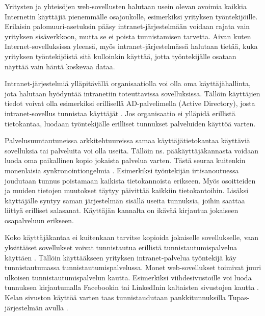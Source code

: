 Yritysten ja yhteisöjen web-sovellusten halutaan usein olevan avoimia kaikkia Internetin käyttäjiä pienemmälle osajoukolle, esimerkiksi yrityksen työntekijöille. Erilaisin palomuuri-asetuksin pääsy intranet-järjestelmään voidaan rajata vain yrityksen sisäverkkoon, mutta se ei poista tunnistamisen tarvetta. Aivan kuten Internet-sovelluksissa yleensä, myös intranet-järjestelmässä halutaan tietää, kuka yrityksen työntekijöistä sitä kulloinkin käyttää, jotta työntekijälle osataan näyttää vain häntä koskevaa dataa.

Intranet-järjestelmiä ylläpitävällä organisaatiolla voi olla oma käyttäjähallinta, jota halutaan hyödyntää intranetiin toteuttavissa sovelluksissa. Tällöin käyttäjien tiedot voivat olla esimerkiksi erillisellä AD-palvelimella (Active Directory), josta intranet-sovellus tunnistaa käyttäjät \cite{active_directory}. Jos organisaatio ei ylläpidä erillistä tietokantaa, luodaan työntekijälle erilliset tunnukset palveluiden käyttöä varten.

Palvelusuuntautuneissa arkkitehtuureissa samaa käyttäjätietokantaa käyttäviä sovelluksia tai palveluita voi olla useita. Tällöin ns. pääkäyttäjäkannasta voidaan luoda oma paikallinen kopio jokaista palvelua varten. Tästä seuraa kuitenkin monenlaisia synkronointiongelmia \cite{synkronointi}. Esimerkiksi työntekijän irtisanoutuessa joudutaan tunnus poistamaan kaikista tietokannoista erikseen. Myös osoitteiden ja muiden tietojen muutokset täytyy päivittää kaikkiin tietokantoihin. Lisäksi käyttäjälle syntyy saman järjestelmän sisällä useita tunnuksia, joihin saattaa liittyä erilliset salasanat. Käyttäjän kannalta on ikävää kirjautua jokaiseen osapalveluun erikseen.

Koko käyttäjäkantaa ei kuitenkaan tarvitse kopioida jokaiselle sovellukselle, vaan yksittäiset sovellukset voivat tunnistautua erillistä tunnistautumispalvelua käyttäen \cite{facebook}. Tällöin käyttääkseen yrityksen intranet-palvelua työntekijä käy tunnistautumassa tunnistautumispalvelussa. Monet web-sovellukset toimivat juuri ulkoisen tunnistautumispalvelun kautta. Esimerkiksi viihdesivustoille voi luoda tunnuksen kirjautumalla Facebookin tai LinkedInin kaltaisten sivustojen kautta \cite{facebook}. Kelan sivuston käyttöä varten taas tunnistaudutaan pankkitunnuksilla Tupas-järjestelmän avulla \cite{tupas}.
